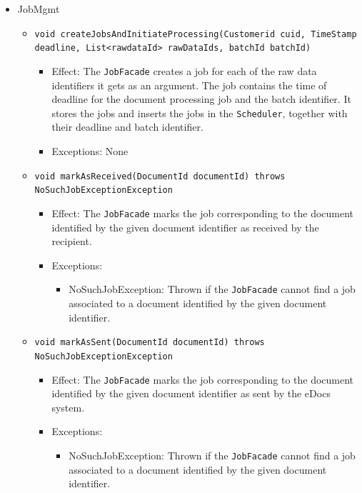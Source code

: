 \documentclass[a4paper,10pt]{article}
\begin{document}
\begin{itemize}
    \item JobMgmt
    \begin{itemize}
    	\item \texttt{void createJobsAndInitiateProcessing(Customerid cuid, TimeStamp deadline, List<rawdataId> rawDataIds, batchId batchId)}
    	\begin{itemize}
            \item Effect: The \texttt{JobFacade} creates a job for each of the raw data identifiers it gets as an argument. The job contains the time of deadline for the document processing job and the batch identifier. It stores the jobs and inserts the jobs in the \texttt{Scheduler}, together with their deadline and batch identifier.
            \item Exceptions: None
        \end{itemize}
    	
    	\item \texttt{void markAsReceived(DocumentId documentId) throws NoSuchJobExceptionException}
    	\begin{itemize}
    		\item Effect: The \texttt{JobFacade} marks the job corresponding to the document identified by the given document identifier as received by the recipient.
    		\item Exceptions:
    		\begin{itemize}
    			\item NoSuchJobException: Thrown if the \texttt{JobFacade} cannot find a job associated to a document identified by the given document identifier.
    		\end{itemize}
    	\end{itemize}
    	
     	\item \texttt{void markAsSent(DocumentId documentId) throws NoSuchJobExceptionException}
    	\begin{itemize}
    		\item Effect: The \texttt{JobFacade} marks the job corresponding to the document identified by the given document identifier as sent by the eDocs system.
    		\item Exceptions:
    		\begin{itemize}
    			\item NoSuchJobException: Thrown if the \texttt{JobFacade} cannot find a job associated to a document identified by the given document identifier.
    		\end{itemize}
    	\end{itemize}   	
  

\end{itemize}
\end{itemize}
\end{document}
